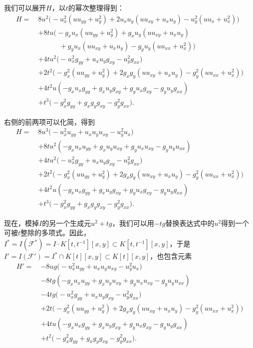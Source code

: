 我们可以展开$H$，以$t$的幂次整理得到：
\[
\begin{aligned}
	H=\ &8u^2\bigl(-u_x^2(uu_{yy}+u_y^2)+2u_xu_y(uu_{xy}+u_xu_y)-u_y^2(uu_x+u_x^2))\\
	&+8tu\bigl(
		-g_xu_x(uu_{yy}+u_y^2)+g_xu_y(uu_{xy}+u_xu_y)\\
	&\qquad\quad +g_yu_x(uu_{xy}+u_xu_y)-g_yu_y(uu_{xx}+u_x^2)\bigr)\\
	&+4tu^2\bigl(-u_x^2g_{yy}+u_xu_yg_{xy}-u_y^2g_{xx}\bigr)\\
	&+2t^2\bigl(-g_x^2(uu_{yy}+u_y^2)+2g_xg_y(uu_{xy}+u_xu_y)-g_y^2(uu_{xx}+u_x^2)\bigr)\\
	&+4t^2u(-g_xu_xg_{yy}+g_xu_yg_{xy}+g_yu_xg_{xy}-g_yu_yg_{xx})\\
	&+t^3\bigl(-g_x^2g_{yy}+g_xg_yg_{xy}-g_y^2g_{xx}\bigr).
\end{aligned}
\]

右侧的前两项可以化简，得到
\[
\begin{aligned}
	H=\ &8u^3\bigl(-u_x^2 u_{yy}+u_xu_y u_{xy}-u_y^2 u_x)\\
	&+8tu^2 (
		-g_xu_x u_{yy}+g_xu_y u_{xy}
		+g_yu_x u_{xy}-g_yu_y u_{xx})\\
	&+4tu^2\bigl(-u_x^2g_{yy}+u_xu_yg_{xy}-u_y^2g_{xx}\bigr)\\
	&+2t^2\bigl(-g_x^2(uu_{yy}+u_y^2)+2g_xg_y(uu_{xy}+u_xu_y)-g_y^2(uu_{xx}+u_x^2)\bigr)\\
	&+4t^2u(-g_xu_xg_{yy}+g_xu_yg_{xy}+g_yu_xg_{xy}-g_yu_yg_{xx})\\
	&+t^3\bigl(-g_x^2g_{yy}+g_xg_yg_{xy}-g_y^2g_{xx}\bigr).
\end{aligned}
\]

现在，模掉$I$的另一个生成元$u^2+tg$，我们可以用$-tg$替换表达式中的$u^2$得到一个可被$t$整除的多项式。因此，$I^*=I(\mathscr F^*)=I\cdot K[t,t^{-1}][x,y]\subset K[t,t^{-1}][x,y]$，于是$I'=I(\mathscr F')=I^*\cap K[t][x,y]\subset K[t][x,y]$，也包含元素
\[
	\begin{aligned}
		H'=\ &-8ug\bigl(-u_x^2 u_{yy}+u_xu_y u_{xy}-u_y^2 u_x)\\
		&-8tg (
			-g_xu_x u_{yy}+g_xu_y u_{xy}
			+g_yu_x u_{xy}-g_yu_y u_{xx})\\
		&-4tg\bigl(-u_x^2g_{yy}+u_xu_yg_{xy}-u_y^2g_{xx}\bigr)\\
		&+2t\bigl(-g_x^2(uu_{yy}+u_y^2)+2g_xg_y(uu_{xy}+u_xu_y)-g_y^2(uu_{xx}+u_x^2)\bigr)\\
		&+4tu(-g_xu_xg_{yy}+g_xu_yg_{xy}+g_yu_xg_{xy}-g_yu_yg_{xx})\\
		&+t^2\bigl(-g_x^2g_{yy}+g_xg_yg_{xy}-g_y^2g_{xx}\bigr).
	\end{aligned}
\]

